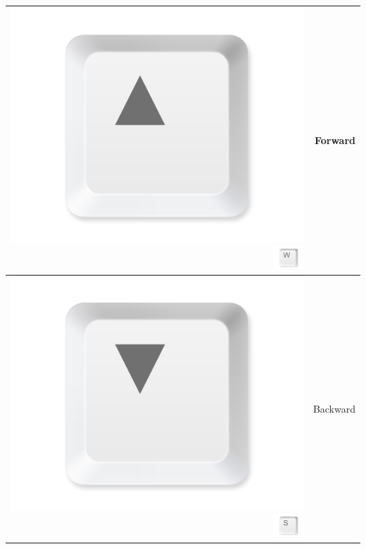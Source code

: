 \documentclass[11pt,a4paper]{report}
\begin{document}
\begin{table}[htbp]
\begin{tabular}{rr}
          \includegraphics[width=\buttonsize\textwidth]{ButtonUp}\includegraphics[width=0.1\textwidth]{ButtonW} & Forward \\
    \midrule
          \includegraphics[width=\buttonsize\textwidth]{ButtonDown}\includegraphics[width=0.1\textwidth]{ButtonS} & Backward \\

\end{tabular}
\end{table}
\end{document}
